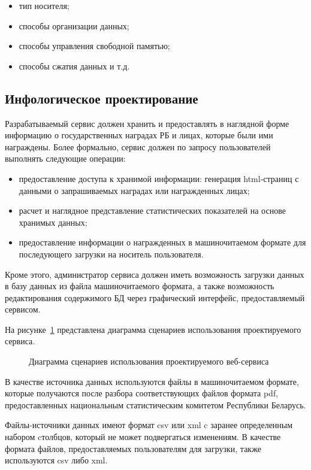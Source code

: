 \begin{itemize}
\item
  тип носителя;
\item
  способы организации данных;
\item
  способы управления свободной памятью;
\item
  способы сжатия данных и т.д.
\end{itemize}

\subsection{Инфологическое проектирование}
\label{ssub:db_info_stage}

Разрабатываемый сервис должен хранить и предоставлять в наглядной форме 
информацию о государственных наградах РБ и лицах, которые были ими награждены.
Более формально, сервис должен по запросу пользователей выполнять следующие операции:
\begin{itemize}
\item
  предоставление доступа к хранимой информации: генерация html-страниц с данными
  о запрашиваемых наградах или награжденных лицах;
\item
  расчет и наглядное представление статистических показателей на основе хранимых данных;
\item
  предоставление информации о награжденных в машиночитаемом формате для последующего 
  загрузки на носитель пользователя. 
\end{itemize}

Кроме этого, администратор сервиса должен иметь возможность загрузки данных в базу данных
из файла машиночитаемого формата, а также возможность редактирования содержимого БД
через графический интерфейс, предоставляемый сервисом.

На рисунке~\ref{fig:use-case_diagram} представлена диаграмма сценариев
использования проектируемого сервиса.

\begin{figure}[h!]
  \centering
  \small{
    
  }
  \caption{Диаграмма сценариев использования проектируемого веб-сервиса}
  \label{fig:use-case_diagram}
\end{figure}

В качестве источника данных используются файлы в машиночитаемом формате,
которые получаются после разбора соответствующих файлов формата pdf,
предоставленных национальным статистическим
комитетом Республики Беларусь.

Файлы-источники данных имеют формат csv или xml c заранее определенным
набором cтолбцов, который не может подвергаться изменениям.
В качестве формата файлов, предоставляемых пользователям для загрузки,
также используются csv либо xml.

